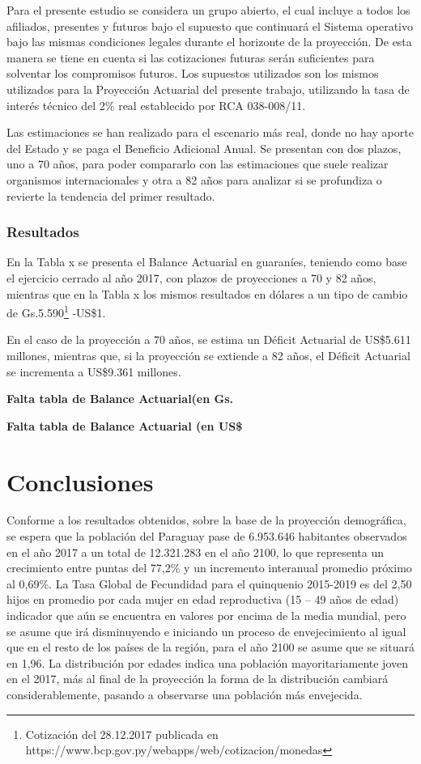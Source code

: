 \documentclass[a4paper,11pt]{article}
\begin{document}
Para el presente estudio se considera un grupo abierto, el cual incluye a todos los afiliados, presentes y futuros bajo el supuesto que continuará el Sistema operativo bajo las mismas condiciones legales durante el horizonte de la proyección.  De esta manera se tiene en cuenta si las cotizaciones futuras serán suficientes para solventar los compromisos futuros.  Los supuestos utilizados son los mismos utilizados para la Proyección Actuarial del presente trabajo, utilizando la tasa de interés técnico del 2\% real establecido por RCA 038-008/11.  

Las estimaciones se han realizado para el escenario más real, donde no hay aporte del Estado y se paga el Beneficio Adicional Anual.  Se presentan con dos plazos, uno a 70 años, para poder compararlo con las estimaciones que suele realizar organismos internacionales y otra a 82 años para analizar si se profundiza o revierte la tendencia del primer resultado.

\subsubsection{Resultados}

En la Tabla x se presenta el Balance Actuarial en guaraníes, teniendo como base el ejercicio cerrado al año 2017, con plazos de proyecciones a 70 y 82 años, mientras que en la Tabla x los mismos resultados en dólares a un tipo de cambio de Gs.5.590\footnote{Cotización del 28.12.2017 publicada en https://www.bcp.gov.py/webapps/web/cotizacion/monedas } -US\$1.

En el caso de la proyección a 70 años, se estima un Déficit Actuarial de US\$5.611 millones, mientras que, si la proyección se extiende a 82 años, el Déficit Actuarial se incrementa a US\$9.361 millones.

\textbf{Falta tabla de Balance Actuarial(en Gs.}

\textbf{Falta tabla de Balance Actuarial (en US\$}

\section{Conclusiones}

Conforme a los resultados obtenidos, sobre la base de la proyección demográfica, se espera que la población del Paraguay pase de 6.953.646 habitantes observados en el año 2017 a un total de 12.321.283 en el año 2100, lo que representa un crecimiento entre puntas del 77,2\% y un incremento interanual promedio próximo al 0,69\%. La Tasa Global de Fecundidad para el quinquenio 2015-2019 es del 2,50 hijos en promedio por cada mujer en edad reproductiva (15 – 49 años de edad) indicador que aún se encuentra en valores por encima de la media mundial, pero se asume que irá disminuyendo e iniciando un proceso de envejecimiento al igual que en el resto de los países de la región, para el año 2100 se asume que se situará en 1,96. La distribución por edades indica una población mayoritariamente joven en el 2017, más al final de la proyección la forma de la distribución cambiará considerablemente, pasando a observarse una población más envejecida.
\end{document}
